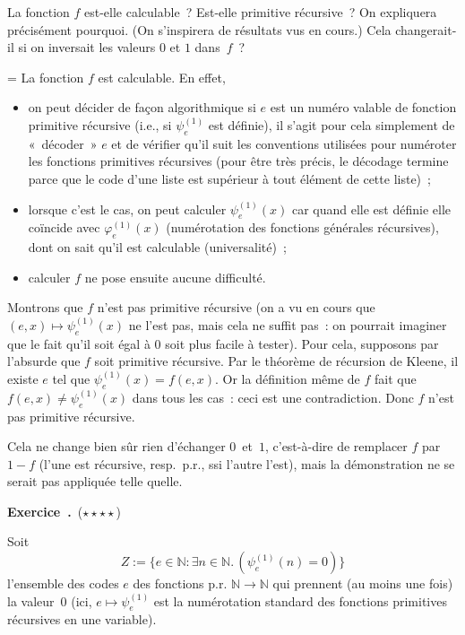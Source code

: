 \documentclass[12pt,a4paper]{article}
\theoremstyle{definition}
\newcommand\exercice{%
\refstepcounter{comcnt}\bigskip\noindent\textbf{Exercice~\thecomcnt.}}
\newif\ifcorrige
\newenvironment{corrige}%
{\ifcorrige\relax\else\setbox0=\vbox\bgroup\fi%
\smallbreak\footnotesize\noindent{\underbar{\textit{Corrigé.}}\quad}}
{{\hbox{}\nobreak\hfill\checkmark}%
\ifcorrige\relax\else\egroup\fi\par}
\begin{document}
La fonction $f$ est-elle calculable ?  Est-elle primitive récursive ?
On expliquera précisément pourquoi.  (On s'inspirera de résultats vus
en cours.)  Cela changerait-il si on inversait les valeurs $0$ et $1$
dans $f$ ?

\begin{corrige}
La fonction $f$ est calculable.  En effet,
\begin{itemize}
\item on peut décider de façon algorithmique si $e$ est un numéro
  valable de fonction primitive récursive (i.e., si $\psi^{(1)}_e$ est
  définie), il s'agit pour cela simplement de « décoder » $e$ et de
  vérifier qu'il suit les conventions utilisées pour numéroter les
  fonctions primitives récursives (pour être très précis, le décodage
  termine parce que le code d'une liste est supérieur à tout élément
  de cette liste) ;
\item lorsque c'est le cas, on peut calculer $\psi^{(1)}_e(x)$ car
  quand elle est définie elle coïncide avec $\varphi^{(1)}_e(x)$
  (numérotation des fonctions générales récursives), dont on sait
  qu'il est calculable (universalité) ;
\item calculer $f$ ne pose ensuite aucune difficulté.
\end{itemize}

Montrons que $f$ n'est pas primitive récursive (on a vu en cours que
$(e,x) \mapsto \psi^{(1)}_e(x)$ ne l'est pas, mais cela ne suffit
pas : on pourrait imaginer que le fait qu'il soit égal à $0$ soit plus
facile à tester).  Pour cela, supposons par l'absurde que $f$ soit
primitive récursive.  Par le théorème de récursion de Kleene, il
existe $e$ tel que $\psi^{(1)}_e(x) = f(e,x)$.  Or la définition même
de $f$ fait que $f(e,x) \neq \psi^{(1)}_e(x)$ dans tous les cas : ceci
est une contradiction.  Donc $f$ n'est pas primitive récursive.

Cela ne change bien sûr rien d'échanger $0$ et $1$, c'est-à-dire de
remplacer $f$ par $1 - f$ (l'une est récursive, resp. p.r., ssi
l'autre l'est), mais la démonstration ne se serait pas appliquée telle
quelle.
\end{corrige}

%

\exercice\ (${\star}{\star}{\star}{\star}$)\par\nobreak

Soit
\[
Z := \{e \in \mathbb{N} : \exists n \in \mathbb{N}.\, (\psi^{(1)}_e(n) = 0)\}
\]
l'ensemble des codes $e$ des fonctions p.r. $\mathbb{N} \to
\mathbb{N}$ qui prennent (au moins une fois) la valeur $0$ (ici, $e
\mapsto \psi^{(1)}_e$ est la numérotation standard des fonctions
primitives récursives en une variable).
\end{document}
